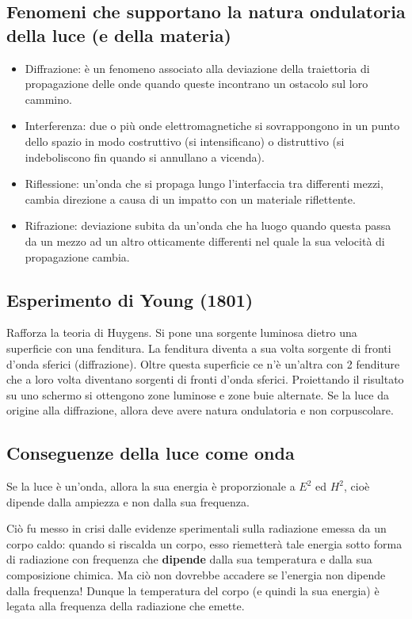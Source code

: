 \subsection{Fenomeni che supportano la natura ondulatoria della luce (e della materia)}
\begin{itemize}
  \item  Diffrazione: è un fenomeno associato alla deviazione della traiettoria di propagazione delle onde quando queste incontrano un ostacolo sul loro cammino.
  \item  Interferenza: due o più onde elettromagnetiche si sovrappongono in un punto dello spazio in modo costruttivo (si intensificano) o distruttivo (si indeboliscono fin quando si annullano a vicenda).
  \item  Riflessione: un'onda che si propaga lungo l'interfaccia tra differenti mezzi, cambia direzione a causa di un impatto con un materiale riflettente.
  \item  Rifrazione: deviazione subita da un'onda che ha luogo quando questa passa da un mezzo ad un altro otticamente differenti nel quale la sua velocità di propagazione cambia.
\end{itemize}
\subsection{Esperimento di Young (1801)}
Rafforza la teoria di Huygens. Si pone una sorgente luminosa dietro una superficie con una fenditura. La fenditura diventa a sua volta sorgente di fronti d'onda sferici (diffrazione). Oltre questa superficie ce n'è un'altra con 2 fenditure che a loro volta diventano sorgenti di fronti d'onda sferici. Proiettando il risultato su uno schermo si ottengono zone luminose e zone buie alternate. Se la luce da origine alla diffrazione, allora deve avere natura ondulatoria e non corpuscolare.

\subsection{Conseguenze della luce come onda}
Se la luce è un'onda, allora la sua energia è proporzionale a $E^2$ ed $H^2$, cioè dipende dalla ampiezza e non dalla sua frequenza. 

Ciò fu messo in crisi dalle evidenze sperimentali sulla radiazione emessa da un corpo caldo: quando si riscalda un corpo, esso riemetterà tale energia sotto forma di radiazione  con frequenza che \textbf{dipende} dalla sua temperatura e dalla sua composizione chimica. Ma ciò non dovrebbe accadere se l'energia non dipende dalla frequenza! Dunque la temperatura del corpo (e quindi la sua energia) è legata alla frequenza della radiazione che emette. 

